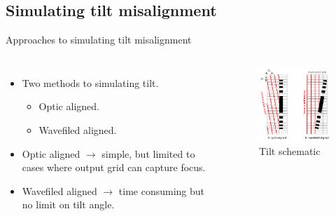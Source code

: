 \documentclass{beamer}
\begin{document}
\subsection{Simulating tilt misalignment}
\begin{frame}{Approaches to simulating tilt misalignment}
	\begin{block}{}
		\begin{columns}[onlytextwidth,T]
			\column{\dimexpr\linewidth-30mm-10mm}
			\begin{itemize}
				\item Two methods to simulating tilt.
				\begin{itemize}
					\item Optic aligned.
					\item Wavefiled aligned.
				\end{itemize}
			\item Optic aligned $\rightarrow$ simple, but limited to cases where output grid can capture focus.	
			\item Wavefiled aligned $\rightarrow $ time consuming but no limit on tilt angle.
			\end{itemize}
			\column{30mm}
			\begin{figure}
				\vspace*{-1cm}\hspace*{-1.25cm}\includegraphics[width=50mm]{tilted_zp_grids}
				\caption{Tilt schematic}
			\end{figure}
		\end{columns}
	\end{block}
\end{frame}
\end{document}
